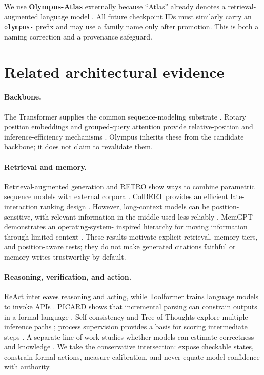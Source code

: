 \documentclass[10pt]{article}
\newcommand{\atlas}{\textbf{Olympus-Atlas}}
\begin{document}
We use \atlas{} externally because ``Atlas'' already denotes a retrieval-
augmented language model \citep{izacard2022atlas}. All future checkpoint IDs
must similarly carry an \texttt{olympus-} prefix and may use a family name only
after promotion. This is both a naming correction and a provenance safeguard.

\section{Related architectural evidence}

\paragraph{Backbone.} The Transformer supplies the common sequence-modeling
substrate \citep{vaswani2017attention}. Rotary position embeddings and
grouped-query attention provide relative-position and inference-efficiency
mechanisms \citep{su2021roformer,ainslie2023gqa}. Olympus inherits these from
the candidate backbone; it does not claim to revalidate them.

\paragraph{Retrieval and memory.} Retrieval-augmented generation and RETRO show
ways to combine parametric sequence models with external corpora
\citep{lewis2020rag,borgeaud2021retro}. ColBERT provides an efficient late-
interaction ranking design \citep{khattab2020colbert}. However, long-context
models can be position-sensitive, with relevant information in the middle used
less reliably \citep{liu2023lost}. MemGPT demonstrates an operating-system-
inspired hierarchy for moving information through limited context
\citep{packer2023memgpt}. These results motivate explicit retrieval, memory
tiers, and position-aware tests; they do not make generated citations faithful
or memory writes trustworthy by default.

\paragraph{Reasoning, verification, and action.} ReAct interleaves reasoning
and acting, while Toolformer trains language models to invoke APIs
\citep{yao2022react,schick2023toolformer}. PICARD shows that incremental parsing
can constrain outputs in a formal language \citep{scholak2021picard}.
Self-consistency and Tree of Thoughts explore multiple inference paths
\citep{wang2022selfconsistency,yao2023tot}; process supervision provides a basis
for scoring intermediate steps \citep{lightman2023verify}. A separate line of
work studies whether models can estimate correctness and knowledge
\citep{kadavath2022know}. We take the conservative intersection: expose
checkable states, constrain formal actions, measure calibration, and never
equate model confidence with authority.
\end{document}
